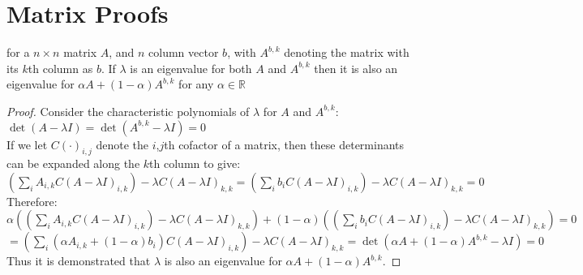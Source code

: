 \section{Matrix Proofs}\label{appendix5b}



\begin{Lemma}\label{lem2}
for a $n\times n$ matrix $A$, and $n$ column vector $b$, with $A^{b,k}$ denoting the matrix with its $k$th column as $b$.
If $\lambda$ is an eigenvalue for both $A$ and $A^{b,k}$ then it is also an eigenvalue for $\alpha A + (1-\alpha)A^{b,k}$ for any $\alpha \in \mathbb{R}$
\end{Lemma}
\begin{proof}
Consider the characteristic polynomials of $\lambda$ for $A$ and $A^{b,k}$:\\
$\det(A-\lambda I)=\det(A^{b,k}-\lambda I)=0$\\
If we let $C(\cdot)_{i,j}$ denote the $i$,$j$th cofactor of a matrix, then these determinants can be expanded along the $k$th column to give:\\
$\left(\sum_iA_{i,k}C(A-\lambda I)_{i,k}\right)-\lambda C(A-\lambda I)_{k,k}=\left(\sum_ib_iC(A-\lambda I)_{i,k}\right)-\lambda C(A-\lambda I)_{k,k}=0$\\
Therefore:\\
$\alpha\left(\left(\sum_iA_{i,k}C(A-\lambda I)_{i,k}\right)-\lambda C(A-\lambda I)_{k,k}\right) + (1-\alpha)\left(\left(\sum_ib_iC(A-\lambda I)_{i,k}\right)-\lambda C(A-\lambda I)_{k,k}\right)=0$\\
$=\left(\sum_i(\alpha A_{i,k}+(1-\alpha)b_i)C(A-\lambda I)_{i,k}\right)-\lambda C(A-\lambda I)_{k,k} =\det(\alpha A + (1-\alpha)A^{b,k}-\lambda I)=0$\\
Thus it is demonstrated that $\lambda$ is also an eigenvalue for $\alpha A + (1-\alpha)A^{b,k}$.
\end{proof}

